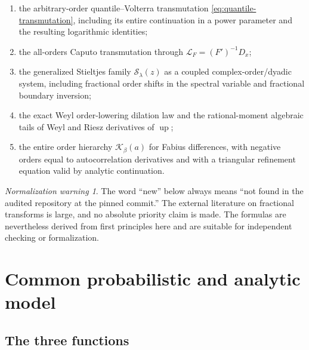 \documentclass[11pt,oneside]{article}
\theoremstyle{definition}
\theoremstyle{remark}
\newtheorem{warning}[theorem]{Normalization warning}
\newcommand{\Up}{\operatorname{up}}
\newcommand{\LapF}{\mathcal L_F}
\newcommand{\Kord}{\mathcal K}
\newcommand{\Sord}{\mathcal S}
\begin{document}
\begin{enumerate}
\item the arbitrary-order quantile--Volterra transmutation
      \eqref{eq:quantile-transmutation}, including its entire continuation in
      a power parameter and the resulting logarithmic identities;
\item the all-orders Caputo transmutation through
      $\LapF=(F')^{-1}D_x$;
\item the generalized Stieltjes family $\Sord_\lambda(z)$ as a coupled
      complex-order/dyadic system, including fractional order shifts in the
      spectral variable and fractional boundary inversion;
\item the exact Weyl order-lowering dilation law and the rational-moment
      algebraic tails of Weyl and Riesz derivatives of $\Up$;
\item the entire order hierarchy $\Kord_\beta(a)$ for Fabius differences,
      with negative orders equal to autocorrelation derivatives and with a
      triangular refinement equation valid by analytic continuation.
\end{enumerate}

\begin{warning}
The word ``new'' below always means ``not found in the audited repository at
the pinned commit.''  The external literature on fractional transforms is
large, and no absolute priority claim is made.  The formulas are nevertheless
derived from first principles here and are suitable for independent checking
or formalization.
\end{warning}

\section{Common probabilistic and analytic model}
\label{sec:model}

\subsection{The three functions}
\end{document}
